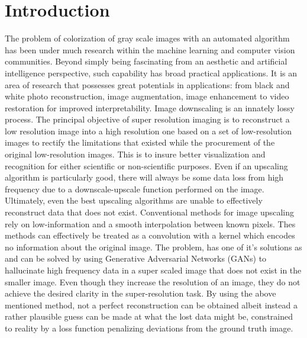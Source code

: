 \documentclass[conference]{IEEEtran}
\begin{document}
\section{Introduction}
The problem of colorization of gray scale images with an automated algorithm has been under much research within the machine learning and computer vision communities. Beyond simply being fascinating from an aesthetic and artificial intelligence perspective, such capability has broad practical applications. It is an area of research that possesses great potentials in applications: from black and white photo reconstruction, image augmentation, image enhancement to video restoration for improved interpretability. 
Image downscaling is an innately lossy process. The principal objective of super resolution imaging is to reconstruct a low resolution image into a high resolution one based on a set of low-resolution images to rectify the limitations that existed while the procurement of the original low-resolution images. This is to insure better visualization and recognition for either scientific or non-scientific purposes. Even if an upscaling algorithm is particularly good, there will always be some data loss from high frequency due to a downscale-upscale function performed on the image. Ultimately, even the best upscaling algorithms are unable to effectively reconstruct data that does not exist. Conventional methods for image upscaling rely on low-information and a smooth interpolation between known pixels. Thes methods can effectively be treated as a convolution with a kernel which encodes no information about the original image. The problem, has one of it's solutions as and can be solved by using Generative Adversarial Networks (GANs) to hallucinate high frequency data in a super scaled image that does not exist in the smaller image. Even though they increase the resolution of an image, they do not achieve the desired clarity in the super-resolution task. By using the above mentioned method, not a perfect reconstruction can be obtained albeit instead a rather plausible guess can be made at what the lost data might be, constrained to reality by a loss function penalizing deviations from the ground truth image.\\  
\end{document}
